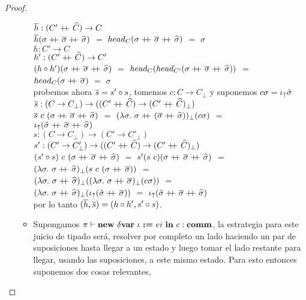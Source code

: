 \begin{proof}
\begin{itemize}
\begin{itemize}
$\overline{h} : (C' +\kern-1.3ex+\kern0.8ex \widehat{C}) \rightarrow C$\\
$\overline{h} (\sigma +\kern-1.3ex+\kern0.8ex \overline{\sigma} +\kern-1.3ex+\kern0.8ex \widehat{\sigma})$ $=$ 
$head_{C} (\sigma +\kern-1.3ex+\kern0.8ex \overline{\sigma} +\kern-1.3ex+\kern0.8ex \widehat{\sigma})$ $=$ $\sigma$\\

$h : C' \rightarrow C$\\
$h' : (C' +\kern-1.3ex+\kern0.8ex \widehat{C}) \rightarrow C'$\\
$(h \circ h') (\sigma +\kern-1.3ex+\kern0.8ex \overline{\sigma} +\kern-1.3ex+\kern0.8ex \widehat{\sigma})$ $=$
$head_{C}(head_{C'} (\sigma +\kern-1.3ex+\kern0.8ex \overline{\sigma} +\kern-1.3ex+\kern0.8ex \widehat{\sigma}))$ $=$\\
$head_{C}(\sigma +\kern-1.3ex+\kern0.8ex \overline{\sigma})$ $=$ $\sigma$\\

probemos ahora $\overline{s} = s' \circ s$, tomemos $c : C \rightarrow C_\bot$ y
suponemos $c \sigma = \iota_{\uparrow} \tilde{\sigma}$\\

$\overline{s} : (C \rightarrow C_\bot) \rightarrow 
		  ((C' +\kern-1.3ex+\kern0.8ex \widehat{C}) \rightarrow (C' +\kern-1.3ex+\kern0.8ex \widehat{C})_\bot)$\\
$\overline{s} \ c \ (\sigma +\kern-1.3ex+\kern0.8ex \overline{\sigma} +\kern-1.3ex+\kern0.8ex \widehat{\sigma})$ $=$
$(\lambda \sigma . \ 
	\sigma \concat (\sigmaover \concat \sigmahat))_{\bot} (c \sigma)$ $=$\\
$\iota_{\uparrow} (\tilde{\sigma} +\kern-1.3ex+\kern0.8ex \overline{\sigma} +\kern-1.3ex+\kern0.8ex \widehat{\sigma})$\\

$s : (C \rightarrow C_\bot) \rightarrow (C' \rightarrow C'_\bot)$\\
$s' : (C' \rightarrow C'_\bot) \rightarrow 
   	  ((C' +\kern-1.3ex+\kern0.8ex \widehat{C}) \rightarrow (C' +\kern-1.3ex+\kern0.8ex \widehat{C})_\bot)$\\
$(s' \circ s) \ c \ (\sigma +\kern-1.3ex+\kern0.8ex \overline{\sigma} +\kern-1.3ex+\kern0.8ex \widehat{\sigma})$ $=$
$s' (s \ c) (\sigma +\kern-1.3ex+\kern0.8ex \overline{\sigma} +\kern-1.3ex+\kern0.8ex \widehat{\sigma})$ $=$\\
$(\lambda \sigma. \ \sigma +\kern-1.3ex+\kern0.8ex \widehat{\sigma})_{\bot}
	(s \ c \ (\sigma +\kern-1.3ex+\kern0.8ex \overline{\sigma}))$ $=$\\
$(\lambda \sigma . \ \sigma +\kern-1.3ex+\kern0.8ex \widehat{\sigma})_{\bot}
((\lambda \sigma . \ \sigma +\kern-1.3ex+\kern0.8ex \overline{\sigma})_{\bot}(c \sigma))$ $=$\\
$(\lambda \sigma . \ \sigma +\kern-1.3ex+\kern0.8ex \widehat{\sigma})_{\bot}
(\iota_{\uparrow} (\tilde{\sigma} +\kern-1.3ex+\kern0.8ex \overline{\sigma}))$ $=$ 
$\iota_{\uparrow} (\tilde{\sigma} +\kern-1.3ex+\kern0.8ex \overline{\sigma} +\kern-1.3ex+\kern0.8ex \widehat{\sigma})$\\

por lo tanto $(\overline{h},\overline{s}) = (h \circ h',s'\circ s)$.\\

\item Supongamos $\pi \vdash \textbf{new} \ \delta \textbf{var} \ \iota \ \textbf{:=} \ ei \ \textbf{in} \ c : \textbf{comm}$, la estrategia para
este juicio de tipado ser\'a, resolver por completo un lado haciendo un par de suposiciones
hasta llegar a un estado y luego tomar el lado restante para llegar, usando las suposiciones,
a este mismo estado. Para esto entonces suponemos dos cosas relevantes,


\end{itemize}
\end{itemize}
\end{proof}
